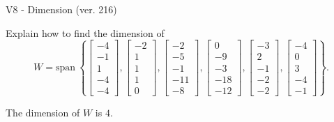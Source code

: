 \begin{exercise}
  \begin{exerciseTitle}V8 - Dimension (ver. 216)\end{exerciseTitle}
  \begin{exerciseStatement}
    Explain how to find the dimension of 
\[W=\mathrm{span}\ \left\{\left[\begin{array}{r}
-4 \\
-1 \\
1 \\
-4 \\
-4
\end{array}\right] , \left[\begin{array}{r}
-2 \\
1 \\
1 \\
1 \\
0
\end{array}\right] , \left[\begin{array}{r}
-2 \\
-5 \\
-1 \\
-11 \\
-8
\end{array}\right] , \left[\begin{array}{r}
0 \\
-9 \\
-3 \\
-18 \\
-12
\end{array}\right] , \left[\begin{array}{r}
-3 \\
2 \\
-1 \\
-2 \\
-2
\end{array}\right] , \left[\begin{array}{r}
-4 \\
0 \\
3 \\
-4 \\
-1
\end{array}\right]\right\}.\]



  \end{exerciseStatement}
  \begin{exerciseAnswer}
   The dimension of \(W\) is  \(4\).
  


  \end{exerciseAnswer}
\end{exercise}